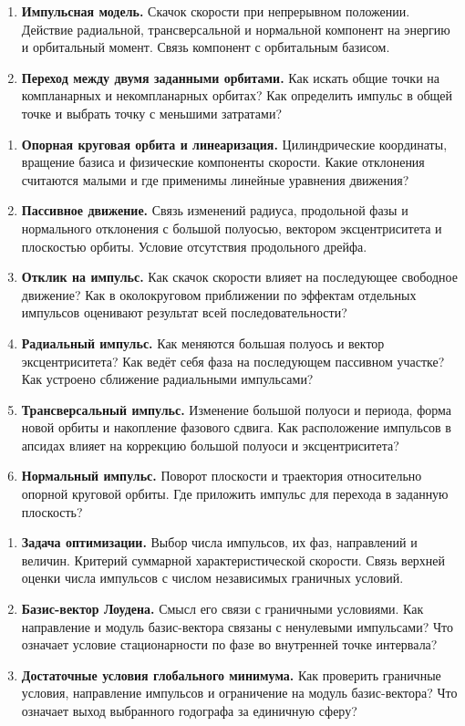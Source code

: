 \documentclass[11pt,a4paper]{article}
\begin{document}
\begin{enumerate}[resume=topics]
\item \textbf{Импульсная модель.} Скачок скорости при непрерывном положении.
Действие радиальной, трансверсальной и нормальной компонент на энергию
и орбитальный момент. Связь компонент с орбитальным базисом.
\item \textbf{Переход между двумя заданными орбитами.} Как искать общие точки
на компланарных и некомпланарных орбитах? Как определить импульс в общей точке
и выбрать точку с меньшими затратами?
\end{enumerate}

\newpage
{}
\begin{enumerate}[resume=topics]
\item \textbf{Опорная круговая орбита и линеаризация.} Цилиндрические координаты,
вращение базиса и физические компоненты скорости. Какие отклонения считаются
малыми и где применимы линейные уравнения движения?
\item \textbf{Пассивное движение.} Связь изменений радиуса, продольной фазы
и нормального отклонения с большой полуосью, вектором эксцентриситета
и плоскостью орбиты. Условие отсутствия продольного дрейфа.
\item \textbf{Отклик на импульс.} Как скачок скорости влияет на последующее
свободное движение? Как в околокруговом приближении по эффектам отдельных
импульсов оценивают результат всей последовательности?
\item \textbf{Радиальный импульс.} Как меняются большая полуось и вектор
эксцентриситета? Как ведёт себя фаза на последующем пассивном участке?
Как устроено сближение радиальными импульсами?
\item \textbf{Трансверсальный импульс.} Изменение большой полуоси и периода,
форма новой орбиты и накопление фазового сдвига. Как расположение импульсов
в апсидах влияет на коррекцию большой полуоси и эксцентриситета?
\item \textbf{Нормальный импульс.} Поворот плоскости и траектория относительно
опорной круговой орбиты. Где приложить импульс для перехода в заданную плоскость?
\end{enumerate}

\begin{enumerate}[resume=topics]
\item \textbf{Задача оптимизации.} Выбор числа импульсов, их фаз, направлений
и величин. Критерий суммарной характеристической скорости. Связь верхней оценки
числа импульсов с числом независимых граничных условий.
\item \textbf{Базис-вектор Лоудена.} Смысл его связи с граничными условиями.
Как направление и модуль базис-вектора связаны с ненулевыми импульсами?
Что означает условие стационарности по фазе во внутренней точке интервала?
\item \textbf{Достаточные условия глобального минимума.} Как проверить
граничные условия, направление импульсов и ограничение на модуль базис-вектора?
Что означает выход выбранного годографа за единичную сферу?
\end{enumerate}
\end{document}
